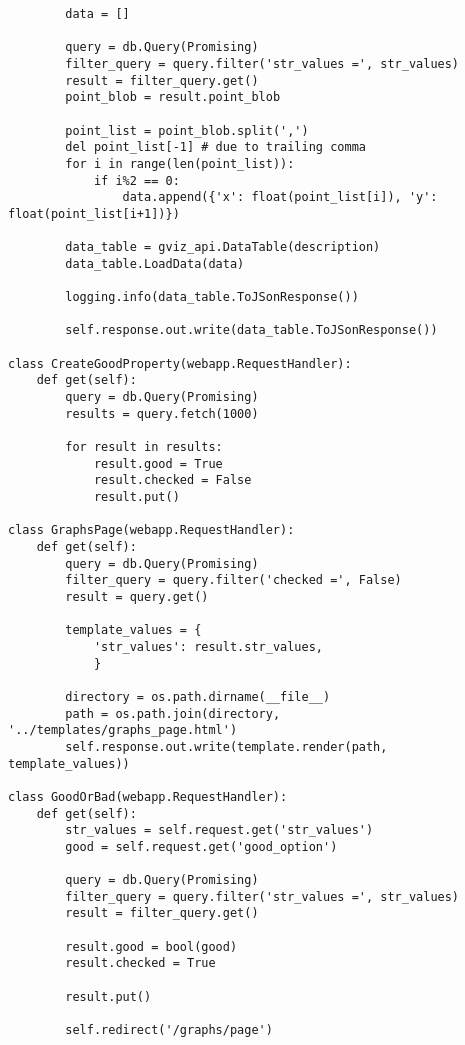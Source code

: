 \documentclass[11pt]{article}
\begin{document}
\begin{verbatim}
        data = []
                
        query = db.Query(Promising)
        filter_query = query.filter('str_values =', str_values)
        result = filter_query.get()
        point_blob = result.point_blob

        point_list = point_blob.split(',')
        del point_list[-1] # due to trailing comma
        for i in range(len(point_list)):
            if i%2 == 0:
                data.append({'x': float(point_list[i]), 'y': float(point_list[i+1])})

        data_table = gviz_api.DataTable(description)
        data_table.LoadData(data)

        logging.info(data_table.ToJSonResponse())

        self.response.out.write(data_table.ToJSonResponse())

class CreateGoodProperty(webapp.RequestHandler):
    def get(self):
        query = db.Query(Promising)
        results = query.fetch(1000)

        for result in results:
            result.good = True
            result.checked = False
            result.put()

class GraphsPage(webapp.RequestHandler):
    def get(self):
        query = db.Query(Promising)
        filter_query = query.filter('checked =', False)
        result = query.get()

        template_values = {
            'str_values': result.str_values,
            }

        directory = os.path.dirname(__file__)
        path = os.path.join(directory, '../templates/graphs_page.html')
        self.response.out.write(template.render(path, template_values))

class GoodOrBad(webapp.RequestHandler):
    def get(self):
        str_values = self.request.get('str_values')
        good = self.request.get('good_option')

        query = db.Query(Promising)
        filter_query = query.filter('str_values =', str_values)
        result = filter_query.get()

        result.good = bool(good)
        result.checked = True

        result.put()

        self.redirect('/graphs/page')
\end{verbatim}
\end{document}
